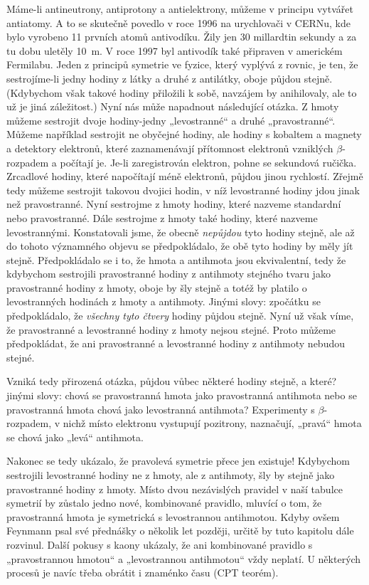    Máme-li antineutrony, antiprotony a antielektrony, můžeme v principu vytvářet antiatomy.
    A to se skutečně povedlo v roce 1996 na urychlovači v CERNu, kde bylo vyrobeno 11 prvních atomů
    antivodíku. Žily jen 30 millardtin sekundy a za tu dobu uletěly \SI{10}{\m}. V roce 1997 byl
    antivodík také připraven v americkém Fermilabu. Jeden z principů symetrie ve fyzice, který
    vyplývá z rovnic, je ten, že sestrojíme-li jedny hodiny z látky a druhé z antilátky, oboje
    půjdou stejně. (Kdybychom však takové hodiny přiložili k sobě, navzájem by anihilovaly, ale to
    už je jiná záležitost.) Nyní nás může napadnout následující otázka. Z hmoty můžeme sestrojit
    dvoje hodiny-jedny „levostranné“ a druhé „pravostranné“. Můžeme například sestrojit ne obyčejné
    hodiny, ale hodiny s kobaltem a magnety a detektory elektronů, které zaznamenávají přítomnost
    elektronů vzniklých \(\beta\)-rozpadem a počítají je. Je-li zaregistrován elektron, pohne se
    sekundová ručička. Zrcadlové hodiny, které napočítají méně elektronů, půjdou jinou rychlostí.
    Zřejmě tedy můžeme sestrojit takovou dvojici hodin, v níž levostranné hodiny jdou jinak než
    pravostranné. Nyní sestrojme z hmoty hodiny, které nazveme standardní nebo pravostranné. Dále
    sestrojme z hmoty také hodiny, které nazveme levostrannými. Konstatovali jsme, že obecně
    \emph{nepůjdou} tyto hodiny stejně, ale až do tohoto významného objevu se předpokládalo, že obě
    tyto hodiny by měly jít stejně. Předpokládalo se i to, že hmota a antihmota jsou ekvivalentní,
    tedy že kdybychom sestrojili pravostranné hodiny z antihmoty stejného tvaru jako pravostranné
    hodiny z hmoty, oboje by šly stejně a totéž by platilo o levostranných hodinách z hmoty a
    antihmoty. Jinými slovy: zpočátku se předpokládalo, že \emph{všechny tyto čtvery} hodiny půjdou
    stejně. Nyní už však víme, že pravostranné a levostranné hodiny z hmoty nejsou stejné. Proto
    můžeme předpokládat, že ani pravostranné a levostranné hodiny z antihmoty nebudou stejné.

    Vzniká tedy přirozená otázka, půjdou vůbec některé hodiny stejně, a které? jinými slovy: chová
    se pravostranná hmota jako pravostranná antihmota nebo se pravostranná hmota chová jako
    levostranná antihmota? Experimenty s \(\beta\)-rozpadem, v nichž místo elektronu vystupují
    pozitrony, naznačují, „pravá“ hmota se chová jako „levá“ antihmota.

    Nakonec se tedy ukázalo, že pravolevá symetrie přece jen existuje! Kdybychom sestrojili
    levostranné hodiny ne z hmoty, ale z antihmoty, šly by stejně jako pravostranné hodiny z hmoty.
    Místo dvou nezávislých pravidel v naší tabulce symetrií by zůstalo jedno nové, kombinované
    pravidlo, mluvící o tom, že pravostranná hmota je symetrická s levostrannou antihmotou. Kdyby
    ovšem Feynmann psal své přednášky o několik let později, určitě by tuto kapitolu dále rozvinul.
    Další pokusy s kaony ukázaly, že ani kombinované pravidlo s „pravostrannou hmotou“ a
    „levostrannou antihmotou“ vždy neplatí. U některých procesů je navíc třeba obrátit i znaménko
    času (CPT teorém). 

